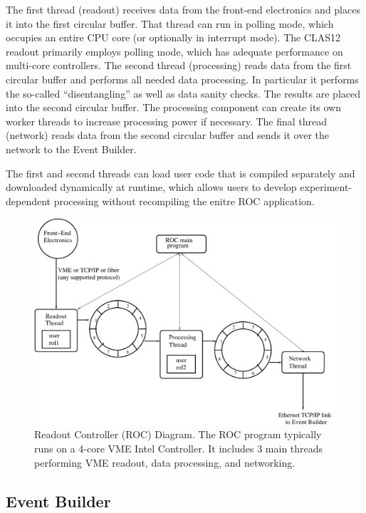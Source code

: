 The first thread (readout) receives data from the front-end electronics and places it into the first circular buffer. That thread can run in polling mode, which occupies an entire CPU core (or optionally in interrupt mode). The CLAS12 readout primarily employs polling mode, which has adequate performance on multi-core controllers. The second thread (processing) reads data from the first circular buffer and performs all needed data processing. In particular it performs the so-called ``disentangling'' as well as data sanity checks. The results are placed into the second circular buffer. The processing component can create its own worker threads to increase processing power if necessary. The final thread (network) reads data from the second circular buffer and sends it over the network to the Event Builder.

The first and second threads can load user code that is compiled separately and downloaded dynamically at runtime, which allows users to develop experiment-dependent processing without recompiling the enitre ROC application.

\begin{figure}[hbt]
	\centering
	\includegraphics[width=1.0\columnwidth,keepaspectratio]{img/roc_diagram.pdf}
	\caption{Readout Controller (ROC) Diagram. The ROC program typically runs on a 4-core VME Intel Controller. It includes 3 main threads performing  VME readout, data processing, and networking.}
	\label{fig:roc_diagram}
\end{figure}


\subsection{Event Builder}

